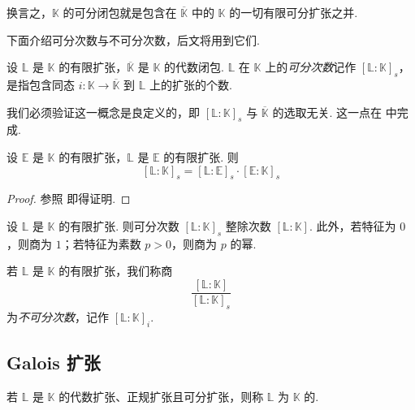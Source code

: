 \begin{remark}\label{c2-rem-1-12}
换言之，$\mathbb{K}$ 的可分闭包就是包含在 $\overline{\mathbb{K}}$ 中的 $\mathbb{K}$ 的一切有限可分扩张之并.
\end{remark}

下面介绍可分次数与不可分次数，后文将用到它们.

\begin{definition}\label{c2-def-1-13}
设 $\mathbb{L}$ 是 $\mathbb{K}$ 的有限扩张，$\overline{\mathbb{K}}$ 是 $\mathbb{K}$ 的代数闭包. $\mathbb{L}$ 在 $\mathbb{K}$ 上的\emph{可分次数}记作 $[\mathbb{L}:\mathbb{K}]_s$，是指包含同态 $i:\mathbb{K}\to\overline{\mathbb{K}}$ 到 $\mathbb{L}$ 上的扩张的个数.

我们必须验证这一概念是良定义的，即 $[\mathbb{L}:\mathbb{K}]_s$ 与 $\overline{\mathbb{K}}$ 的选取无关. 这一点在 \cite[\S4, Chapter~V]{lang02a} 中完成.
\end{definition}

\begin{proposition}\label{c2-prop-1-2}
设 $\mathbb{E}$ 是 $\mathbb{K}$ 的有限扩张，$\mathbb{L}$ 是 $\mathbb{E}$ 的有限扩张. 则
\[
[\mathbb{L}:\mathbb{K}]_s=[\mathbb{L}:\mathbb{E}]_s\cdot[\mathbb{E}:\mathbb{K}]_s
\]
\end{proposition}

\begin{proof}
参照 \cite[Theorem~4.1, \S1, Chapter~V]{lang02a} 即得证明.
\end{proof}

\begin{proposition}\label{c2-prop-1-3}
设 $\mathbb{L}$ 是 $\mathbb{K}$ 的有限扩张. 则可分次数 $[\mathbb{L}:\mathbb{K}]_s$ 整除次数 $[\mathbb{L}:\mathbb{K}]$. 此外，若特征为 $0$，则商为 $1$；若特征为素数 $p>0$，则商为 $p$ 的幂.
\end{proposition}

\begin{definition}\label{c2-def-1-14}
若 $\mathbb{L}$ 是 $\mathbb{K}$ 的有限扩张，我们称商
\[
\frac{[\mathbb{L}:\mathbb{K}]}{[\mathbb{L}:\mathbb{K}]_s}
\]
为\emph{不可分次数}，记作 $[\mathbb{L}:\mathbb{K}]_i$.
\end{definition}

\subsection{Galois 扩张}

\begin{definition}\label{c2-def-1-15}
若 $\mathbb{L}$ 是 $\mathbb{K}$ 的代数扩张、正规扩张且可分扩张，则称 $\mathbb{L}$ 为 $\mathbb{K}$ 的.
\end{definition}

